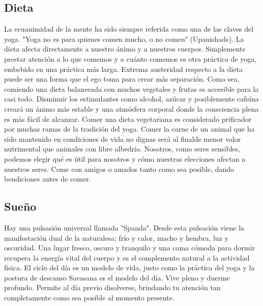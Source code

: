 \subsection{Dieta}
La ecuanimidad de la mente ha sido siempre referida como una de las claves del yoga. "Yoga no es para quienes comen mucho, o no comen" (Upanishads). La dieta afecta directamente a nuestro ánimo y a nuestros cuerpos. Simplemente prestar atención a lo que comemos y a cuánto comemos es otra práctica de yoga, embebido en una práctica más larga. Extrema austeridad respecto a la dieta puede ser una forma que el ego toma para crear más separación. Como sea, comiendo una dieta balanceada con muchos vegetales y frutas es accesible para la casi todo. Disminuir los estimulantes como alcohol, azúcar y posiblemente cafeína creará un ánimo más estable y una atmósfera corporal donde la consciencia plena es más fácil de alcanzar. Comer una dieta vegetariana es considerado prificador por muchas ramas de la tradición del yoga. Comer la carne de un animal que ha sido mantenido en condiciones de vida no dignas será al finalde menor valor nutrimental que animales con libre albedrío. Nosotros, como seres sensibles, podemos elegir qu\'e es útil para nosotros y cómo nuestras elecciones afectan a nuestros seres. Come con amigos o amados tanto como sea posible, dando bendiciones antes de comer.

\subsection{Sueño}
Hay una pulsasión universal llamada "Spanda". Desde esta pulsación viene la manifestación dual de la naturalesa; frío y calor, macho y hembra, luz y oscuridad. Una lugar fresco, oscuro y tranquilo y una cama cómoda para dormir recupera la energía vital del cuerpo y es el complemento natural a la actividad física. El ciclo del día es un modelo de vida, justo como la práctica del yoga y la postura de descanso Savasana es el modelo del día. Vive pleno y duerme profundo. Permite al día previo disolverse, brindando tu atención tan completamente como sea posible al momento presente.

